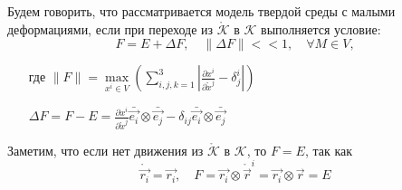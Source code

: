

Будем говорить, что рассматривается модель твердой среды с малыми деформациями, если при переходе из $\mathring{\mathcal{K}}$ в $\mathcal{K}$ выполняется условие:
\begin{equation*}
	F = E + \Delta F,\quad \|\Delta F\|<<1,\quad \forall M\in V,
\end{equation*}
\begin{itemize}
	\item[где] $\|F\|=\max\limits_{x^i\in V}\left(\sum\limits_{i,j,k=1}^{3}\left|\frac{\partial x^i}{\partial\mathring{x}^j}-\delta^i_j\right|\right)$
	\item[] $\Delta F = F-E=\frac{\partial x^i}{\partial\mathring{x}^j}\bar{\vec{e_i}}\otimes\bar{\vec{e_j}}-\delta_{ij}\bar{\vec{e_i}}\otimes\bar{\vec{e_j}}$
\end{itemize}

Заметим, что если нет движения из $\mathring{\mathcal{K}}$ в $\mathcal{K}$, то $F=E$, так как
\begin{equation*}
	\mathring{\vec{r_i}}=\vec{r_i},\quad F=\vec{r_i}\otimes\mathring{\vec{r}}^i=\vec{r_i}\otimes\vec{r}=E
\end{equation*}

